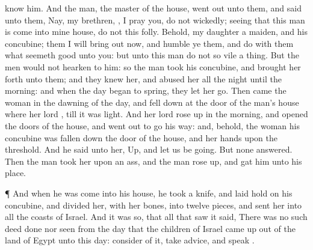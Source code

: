 {know him.
And the
man, the
master of the
house, went
out unto them, and
said unto them,
Nay, my
brethren,
{}, I pray you, do not
{}
wickedly;
seeing that this
man is
come into mine
house,
do not this
folly.
Behold,
{} my
daughter a
maiden, and his
concubine; them I will bring
out now, and
humble ye them, and
do with them what
seemeth
good unto you: but unto this
man
do not
so
vile a
thing.
But the
men
would not
hearken to him: so the
man
took his
concubine, and
brought her
forth unto them; and they
knew her, and
abused her all the
night until the
morning: and when the
day began to
spring, they let her
go.
Then
came the
woman in the
dawning of the
day, and fell
down at the
door of the
man’s
house where her
lord
{}, till it was
light.
And her
lord rose
up in the
morning, and
opened the
doors of the
house, and went
out to
go his
way: and, behold, the
woman his
concubine was fallen
down
{} the
door of the
house, and her
hands
{} upon the
threshold.
And he
said unto her,
Up, and let us be
going. But none
answered. Then the
man
took her
{} upon an
ass, and the
man rose
up, and
gat him unto his
place.
\par }{\PP {}¶ And when he was
come into his
house, he
took a
knife, and laid
hold on his
concubine, and
divided her,
{} with her
bones, into
twelve
pieces, and
sent her into all the
coasts of
Israel.
And it was
so, that all that
saw it
said, There was no such
deed done nor
seen from the
day that the
children of
Israel came
up out of the
land of
Egypt unto this
day:
consider of it, take
advice, and
speak
{}.

}
